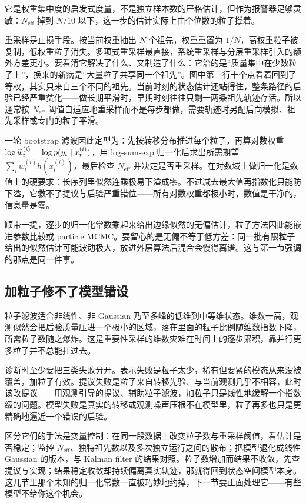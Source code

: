 它是权重集中度的启发式度量，不是独立样本数的严格估计，但作为报警器足够灵敏：\(N_{\mathrm{eff}}\) 掉到 \(N/10\) 以下，这一步的估计实际上由个位数的粒子撑着。

重采样是止损手段。按当前权重抽出 \(N\) 个祖先，权重重置为 \(1/N\)，高权重粒子被复制，低权重粒子消失。多项式重采样最直接，系统重采样与分层重采样引入的额外方差更小。要看清它解决了什么、又制造了什么：它治的是``质量集中在少数粒子上''，换来的新病是``大量粒子共享同一个祖先''。图中第三行十个点看着回到了等权，其实只来自三个不同的祖先。当前时刻的状态估计还站得住，整条路径的后验已经严重贫化——做长期平滑时，早期时刻往往只剩一两条祖先轨迹存活。所以通常按 \(N_{\mathrm{eff}}\) 阈值自适应地重采样而不是每步都做，需要轨迹时另配后向模拟、祖先采样或专门的粒子平滑。

一轮 bootstrap 滤波因此定型为：先按转移分布推进每个粒子，再算对数权重 \(\log\widetilde w_t^{(i)}=\log p(y_t\mid x_t^{(i)})\)，用 log-sum-exp 归一化后求出所需期望 \(\sum_iw_t^{(i)}h(x_t^{(i)})\)，最后检查 \(N_{\mathrm{eff}}\) 并决定是否重采样。在对数域上做归一化是数值上的硬要求：长序列里似然连乘极易下溢成零。不过减去最大值再指数化只能防下溢，它救不了提议与后验严重错位——所有对数权重都极小时，数值是干净的，信息量是零。

顺带一提，逐步的归一化常数乘起来给出边缘似然的无偏估计，粒子方法因此能嵌进参数比较或 particle MCMC。要留心的是无偏不等于低方差：同一批有限粒子给出的似然估计可能波动极大，放进外层算法后混合会慢得离谱。这与第一节强调的那点是同一件事。

\subsection{加粒子修不了模型错设}

粒子滤波适合非线性、非 Gaussian 乃至多峰的低维到中等维状态。维数一高，观测似然会把后验质量压进一个极小的区域，落在里面的粒子比例随维数指数下降，所需粒子数随之爆炸。这是重要性采样的维数灾难在时间上的逐步累积，靠并行更多粒子并不总能扛过去。

诊断时至少要把三类失败分开。表示失败是粒子太少，稀有但要紧的模态从来没被覆盖，加粒子有效。提议失败是粒子来自转移先验、与当前观测几乎不相容，此时该改提议——用观测引导的提议、辅助粒子滤波，加粒子只是线性地缓解一个指数级的问题。模型失败是真实的转移或观测噪声压根不在模型里，粒子再多也只是更精确地逼近一个错误的后验。

区分它们的手法是变量控制：在同一段数据上改变粒子数与重采样阈值，看估计是否稳定；监控 \(N_{\mathrm{eff}}\)、独特祖先数以及多次独立运行之间的散布；把模型退化成线性 Gaussian 的版本，与 Kalman filter 的结果对照。粒子数增加而结果不收敛，先查提议与实现；结果稳定收敛却持续偏离真实轨迹，那就得回到状态空间模型本身。这几节里那个未知的归一化常数一直被巧妙地约掉，下一节要正面处理它——有些模型不给你这个机会。
